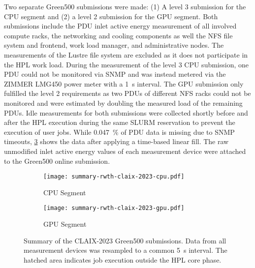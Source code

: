 Two separate Green500 submissions were made: (1) A level 3 submission for the CPU segment and (2) a level 2 submission for the GPU segment.
Both submissions include the \ac{PDU} inlet active energy measurement of all involved compute racks, the networking and cooling components as well the NFS file system and frontend, work load manager, and administrative nodes.
The measurements of the Lustre file system are excluded as it does not participate in the HPL work load.
During the measurement of the level 3 CPU submission, one \ac{PDU} could not be monitored via SNMP and was instead metered via the ZIMMER LMG450 power meter with a \SI{1}{\second} interval.
The GPU submission only fulfilled the level 2 requirements as two \acp{PDU} of different NFS racks could not be monitored and were estimated by doubling the measured load of the remaining \acp{PDU}.
Idle measurements for both submissions were collected shortly before and after the HPL execution during the same SLURM reservation to prevent the execution of user jobs.
While \SI{0.047}{\percent} of \ac{PDU} data is missing due to SNMP timeouts, \cref{fig:summary-rwth-claix-2023} shows the data after applying a time-based linear fill.
The raw unmodified inlet active energy values of each measurement device were attached to the Green500 online submission.



\begin{figure}[htbp]
    \centering
    \hfill
    \begin{subfigure}{0.45\textwidth}
        \centering
        \texttt{[image: summary-rwth-claix-2023-cpu.pdf]}
        \caption{CPU Segment}
        \label{fig:summary-rwth-claix-2023-cpu}
    \end{subfigure}
    \hfill
    \begin{subfigure}{0.45\textwidth}
        \centering
        \texttt{[image: summary-rwth-claix-2023-gpu.pdf]}
        \caption{GPU Segment}
        \label{fig:summary-rwth-claix-2023-gpu}
    \end{subfigure}
    \hfill
    \caption{Summary of the CLAIX-2023 Green500 submissions. Data from all measurement devices was resampled to a common \SI{5}{\second} interval. The hatched area indicates job execution outside the HPL core phase.}
    \label{fig:summary-rwth-claix-2023}
\end{figure}
